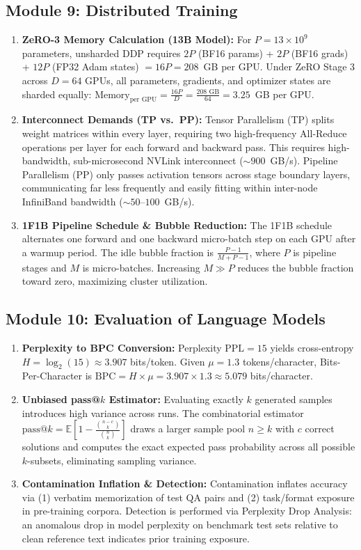 \documentclass[11pt,a4paper]{article}
\begin{document}
	\subsection*{Module 9: Distributed Training}
	\begin{enumerate}
		\item \textbf{ZeRO-3 Memory Calculation (13B Model):} For $P = 13 \times 10^9$ parameters, unsharded DDP requires $2P$ (BF16 params) + $2P$ (BF16 grads) + $12P$ (FP32 Adam states) $= 16P = 208$~GB per GPU. Under ZeRO Stage 3 across $D = 64$ GPUs, all parameters, gradients, and optimizer states are sharded equally: $\text{Memory}_{\text{per GPU}} = \frac{16 P}{D} = \frac{208\text{ GB}}{64} = 3.25$~GB per GPU.
		\item \textbf{Interconnect Demands (TP vs.\ PP):} Tensor Parallelism (TP) splits weight matrices within every layer, requiring two high-frequency All-Reduce operations per layer for each forward and backward pass. This requires high-bandwidth, sub-microsecond NVLink interconnect ($\sim 900$~GB/s). Pipeline Parallelism (PP) only passes activation tensors across stage boundary layers, communicating far less frequently and easily fitting within inter-node InfiniBand bandwidth ($\sim 50$--$100$~GB/s).
		\item \textbf{1F1B Pipeline Schedule \& Bubble Reduction:} The 1F1B schedule alternates one forward and one backward micro-batch step on each GPU after a warmup period. The idle bubble fraction is $\frac{P - 1}{M + P - 1}$, where $P$ is pipeline stages and $M$ is micro-batches. Increasing $M \gg P$ reduces the bubble fraction toward zero, maximizing cluster utilization.
	\end{enumerate}

	\subsection*{Module 10: Evaluation of Language Models}
	\begin{enumerate}
		\item \textbf{Perplexity to BPC Conversion:} Perplexity $\mathrm{PPL} = 15$ yields cross-entropy $H = \log_2(15) \approx 3.907$ bits/token. Given $\mu = 1.3$ tokens/character, Bits-Per-Character is $\mathrm{BPC} = H \times \mu = 3.907 \times 1.3 \approx 5.079$ bits/character.
		\item \textbf{Unbiased pass@$k$ Estimator:} Evaluating exactly $k$ generated samples introduces high variance across runs. The combinatorial estimator $\mathrm{pass@}k = \mathbb{E}\left[1 - \frac{\binom{n-c}{k}}{\binom{n}{k}}\right]$ draws a larger sample pool $n \ge k$ with $c$ correct solutions and computes the exact expected pass probability across all possible $k$-subsets, eliminating sampling variance.
		\item \textbf{Contamination Inflation \& Detection:} Contamination inflates accuracy via (1) verbatim memorization of test QA pairs and (2) task/format exposure in pre-training corpora. Detection is performed via Perplexity Drop Analysis: an anomalous drop in model perplexity on benchmark test sets relative to clean reference text indicates prior training exposure.
	\end{enumerate}
\end{document}
